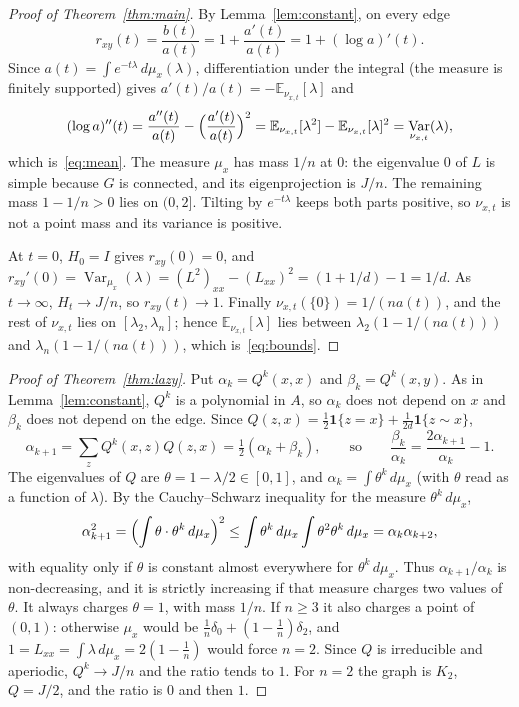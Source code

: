 \documentclass[11pt]{amsart}
\theoremstyle{definition}
\theoremstyle{remark}
\DeclareMathOperator{\Var}{Var}
\newcommand{\E}{\mathbb{E}}
\begin{document}
\begin{proof}[Proof of Theorem~\ref{thm:main}]
By Lemma~\ref{lem:constant}, on every edge
\[
r_{xy}(t)=\frac{b(t)}{a(t)}=1+\frac{a'(t)}{a(t)}=1+(\log a)'(t).
\]
Since $a(t)=\int e^{-t\lambda}\,d\mu_x(\lambda)$, differentiation under the integral (the measure is finitely supported) gives $a'(t)/a(t)=-\E_{\nu_{x,t}}[\lambda]$ and
\[
(\log a)''(t)=\frac{a''(t)}{a(t)}-\Bigl(\frac{a'(t)}{a(t)}\Bigr)^2=\E_{\nu_{x,t}}[\lambda^2]-\E_{\nu_{x,t}}[\lambda]^2=\Var_{\nu_{x,t}}(\lambda),
\]
which is~\eqref{eq:mean}. The measure $\mu_x$ has mass $1/n$ at $0$: the eigenvalue $0$ of $L$ is simple because $G$ is connected, and its eigenprojection is $J/n$. The remaining mass $1-1/n>0$ lies on $(0,2]$. Tilting by $e^{-t\lambda}$ keeps both parts positive, so $\nu_{x,t}$ is not a point mass and its variance is positive.

At $t=0$, $H_0=I$ gives $r_{xy}(0)=0$, and $r_{xy}'(0)=\Var_{\mu_x}(\lambda)=(L^2)_{xx}-(L_{xx})^2=(1+1/d)-1=1/d$. As $t\to\infty$, $H_t\to J/n$, so $r_{xy}(t)\to1$. Finally $\nu_{x,t}(\{0\})=1/(na(t))$, and the rest of $\nu_{x,t}$ lies on $[\lambda_2,\lambda_n]$; hence $\E_{\nu_{x,t}}[\lambda]$ lies between $\lambda_2(1-1/(na(t)))$ and $\lambda_n(1-1/(na(t)))$, which is~\eqref{eq:bounds}.
\end{proof}

\begin{proof}[Proof of Theorem~\ref{thm:lazy}]
Put $\alpha_k=Q^k(x,x)$ and $\beta_k=Q^k(x,y)$. As in Lemma~\ref{lem:constant}, $Q^k$ is a polynomial in $A$, so $\alpha_k$ does not depend on $x$ and $\beta_k$ does not depend on the edge. Since $Q(z,x)=\tfrac12\mathbf 1\{z=x\}+\tfrac1{2d}\mathbf 1\{z\sim x\}$,
\[
\alpha_{k+1}=\sum_z Q^k(x,z)Q(z,x)=\tfrac12(\alpha_k+\beta_k),\qquad\text{so}\qquad \frac{\beta_k}{\alpha_k}=\frac{2\alpha_{k+1}}{\alpha_k}-1 .
\]
The eigenvalues of $Q$ are $\theta=1-\lambda/2\in[0,1]$, and $\alpha_k=\int\theta^k\,d\mu_x$ (with $\theta$ read as a function of $\lambda$). By the Cauchy--Schwarz inequality for the measure $\theta^k\,d\mu_x$,
\[
\alpha_{k+1}^2=\Bigl(\int\theta\cdot\theta^k\,d\mu_x\Bigr)^2\le\int\theta^k\,d\mu_x\int\theta^2\theta^k\,d\mu_x=\alpha_k\alpha_{k+2},
\]
with equality only if $\theta$ is constant almost everywhere for $\theta^k\,d\mu_x$. Thus $\alpha_{k+1}/\alpha_k$ is non-decreasing, and it is strictly increasing if that measure charges two values of $\theta$. It always charges $\theta=1$, with mass $1/n$. If $n\ge3$ it also charges a point of $(0,1)$: otherwise $\mu_x$ would be $\frac1n\delta_0+(1-\frac1n)\delta_2$, and $1=L_{xx}=\int\lambda\,d\mu_x=2(1-\frac1n)$ would force $n=2$. Since $Q$ is irreducible and aperiodic, $Q^k\to J/n$ and the ratio tends to $1$. For $n=2$ the graph is $K_2$, $Q=J/2$, and the ratio is $0$ and then $1$.
\end{proof}
\end{document}
